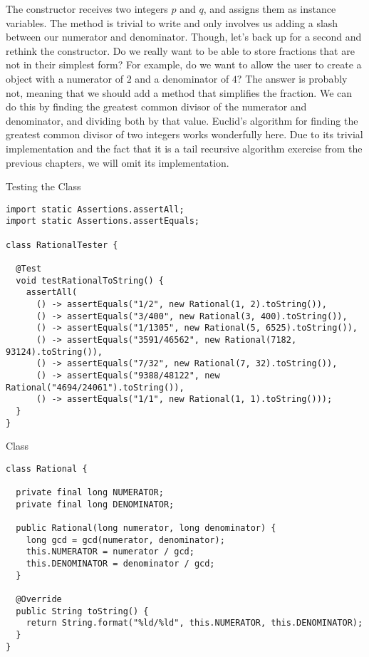 The  constructor receives two integers $p$ and $q$, and assigns them as instance variables. The  method is trivial to write and only involves us adding a slash between our numerator and denominator. Though, let's back up for a second and rethink the constructor. Do we really want to be able to store fractions that are not in their simplest form? For example, do we want to allow the user to create a  object with a numerator of $2$ and a denominator of $4$? The answer is probably not, meaning that we should add a method that simplifies the fraction. We can do this by finding the greatest common divisor of the numerator and denominator, and dividing both by that value. Euclid's algorithm for finding the greatest common divisor of two integers works wonderfully here. Due to its trivial implementation and the fact that it is a tail recursive algorithm exercise from the previous chapters, we will omit its implementation.

\begin{cl}[]{Testing the  Class}
\begin{lstlisting}[language=MyJava]
import static Assertions.assertAll;
import static Assertions.assertEquals;

class RationalTester {
  
  @Test
  void testRationalToString() {
    assertAll(
      () -> assertEquals("1/2", new Rational(1, 2).toString()),
      () -> assertEquals("3/400", new Rational(3, 400).toString()),
      () -> assertEquals("1/1305", new Rational(5, 6525).toString()),
      () -> assertEquals("3591/46562", new Rational(7182, 93124).toString()),
      () -> assertEquals("7/32", new Rational(7, 32).toString()),
      () -> assertEquals("9388/48122", new Rational("4694/24061").toString()),
      () -> assertEquals("1/1", new Rational(1, 1).toString()));
  }
}
\end{lstlisting}
\end{cl}

\begin{cl}[]{ Class}
\begin{lstlisting}[language=MyJava]
class Rational {
  
  private final long NUMERATOR;
  private final long DENOMINATOR;

  public Rational(long numerator, long denominator) {
    long gcd = gcd(numerator, denominator);
    this.NUMERATOR = numerator / gcd;
    this.DENOMINATOR = denominator / gcd; 
  }

  @Override
  public String toString() {
    return String.format("%ld/%ld", this.NUMERATOR, this.DENOMINATOR);
  }
}
\end{lstlisting}
\end{cl}

